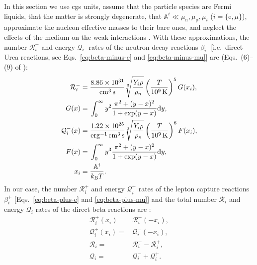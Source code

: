 \documentclass[aps,prd,twocolumn,a4paper,floatfix,nofootbib,superscriptaddress,nofootinbib]{revtex4}
\newcommand{\re}{\mathrm{e}}
\newcommand{\rn}{\mathrm{n}}
\begin{document}
In this section we use cgs units, assume that the particle species are
Fermi liquids, that the matter is strongly degenerate, that $\mathbb A^i \ll
\mu_\rn,\mu_\mathrm p,\mu_i$ ($i=\{\re,\mu\}$), approximate the nucleon
effective masses to their bare ones, and neglect the effects of the
medium on the weak interactions \cite{Haensel92}. With these
approximations, the number $\mathcal R_i^-$ and energy $\mathcal Q_i^-$ rates
of the neutron decay reactions $\beta_i^-$ [i.e.~direct Urca reactions, see
Eqs.~\eqref{eq:beta-minus-e} and \eqref{eq:beta-minus-mu}] are (Eqs.~(6)--(9)
of \citet{Haensel92}):
%
\begin{align}
%
\mathcal R_i^-={}&\frac{8.86\times 10^{31}}{\unit{cm^{3}\,s}}\sqrt[3]{\frac{Y_i\rho}{\rho_n}}
\left(\frac{T}{\unit[10^9]{K}}\right)^5 G(x_i)
,\\
%
\label{eq:g-def}
G(x)={}&\int_0^\infty y^2\frac{\pi^2 + (y - x)^2}{1 + \exp(y-x)}\mathrm dy,\\
%
\mathcal Q_i^-(x)={}&\frac{1.22\times 10^{25}}{\unit{erg^{-1}\,cm^{3}\,s}}\sqrt[3]{\frac{Y_i\rho}{\rho_n}}
\left(\frac{T}{\unit[10^9]{K}}\right)^6 F(x_i),\\
%
\label{eq:f-def}
F(x)={}&\int_0^\infty y^3\frac{\pi^2+(y-x)^2}{1+\exp(y-x)}\mathrm dy,\\
%
x_i={}&\frac{\mathbb A^i}{k_\mathrm{B}T}.
%
\end{align}
%
In our case, the number $\mathcal R_i^+$ and energy $\mathcal Q_i^+$ rates of the lepton capture reactions $\beta^+_i$
[Eqs.~\eqref{eq:beta-plus-e} and \eqref{eq:beta-plus-mu}] and the total
number $\mathcal R_i$ and energy $\mathcal Q_i$ rates of the direct beta reactions are \cite{Haensel92}:
%
\begin{align}
%
\mathcal R_i^+(x_i)={}& \mathcal R_i^-(-x_i),\\
%
\mathcal Q_i^+(x_i)={}&\mathcal Q_i^-(-x_i),\\
%
\label{eq:tot-nrate}
\mathcal R_i={}& \mathcal R_i^- - \mathcal R_i^+,\\
%
\label{eq:tot-erate}
\mathcal Q_i={}&\mathcal Q_i^- + \mathcal Q_i^+.
\end{align}
\end{document}
